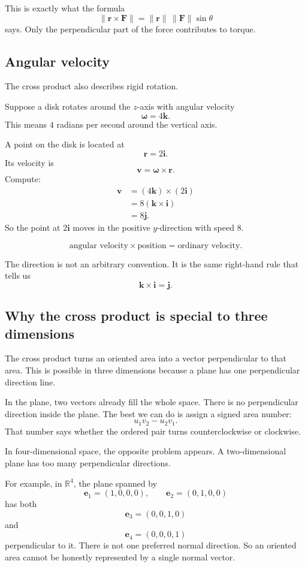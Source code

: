 This is exactly what the formula
\[
    \|\mathbf r\times\mathbf F\|
    =
    \|\mathbf r\|\,\|\mathbf F\|\sin\theta
\]
says.  Only the perpendicular part of the force contributes to torque.

\subsection{Angular velocity}

The cross product also describes rigid rotation.

Suppose a disk rotates around the \(z\)-axis with angular velocity
\[
    \boldsymbol\omega=4\mathbf k.
\]
This means \(4\) radians per second around the vertical axis.

A point on the disk is located at
\[
    \mathbf r=2\mathbf i.
\]
Its velocity is
\[
    \mathbf v=\boldsymbol\omega\times\mathbf r.
\]
Compute:
\[
\begin{aligned}
\mathbf v
&=
(4\mathbf k)\times(2\mathbf i)\\
&=
8(\mathbf k\times\mathbf i)\\
&=
8\mathbf j.
\end{aligned}
\]
So the point at \(2\mathbf i\) moves in the positive \(y\)-direction with speed \(8\).

\[
    \text{angular velocity} \times \text{position}
    =
    \text{ordinary velocity}.
\]

The direction is not an arbitrary convention.  It is the same right-hand rule that tells
us
\[
    \mathbf k\times\mathbf i=\mathbf j.
\]

\subsection{Why the cross product is special to three dimensions}

The cross product turns an oriented area into a vector perpendicular to that area.  This
is possible in three dimensions because a plane has one perpendicular direction line.

In the plane, two vectors already fill the whole space.  There is no perpendicular
direction inside the plane.  The best we can do is assign a signed area number:
\[
    u_1v_2-u_2v_1.
\]
That number says whether the ordered pair turns counterclockwise or clockwise.

In four-dimensional space, the opposite problem appears.  A two-dimensional plane has
too many perpendicular directions.

For example, in \(\mathbb R^4\), the plane spanned by
\[
    \mathbf e_1=(1,0,0,0),
    \qquad
    \mathbf e_2=(0,1,0,0)
\]
has both
\[
    \mathbf e_3=(0,0,1,0)
\]
and
\[
    \mathbf e_4=(0,0,0,1)
\]
perpendicular to it.  There is not one preferred normal direction.  So an oriented area
cannot be honestly represented by a single normal vector.

